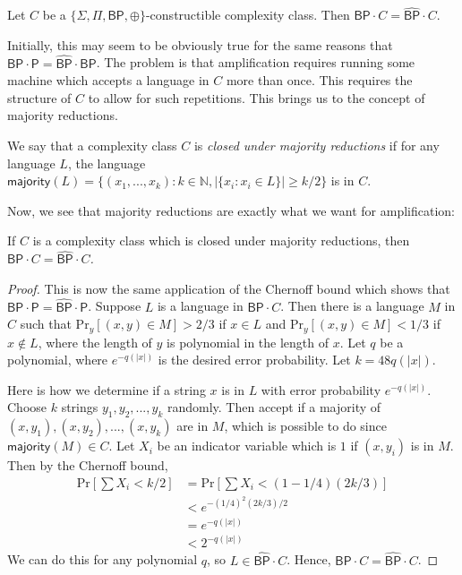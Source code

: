 \documentclass[11pt]{article}
\newcommand{\pr}{\text{Pr}}
\newcommand{\bp}{\textsf{BP}}
\newcommand{\strongbp}{\widehat{\textsf{BP}}}
\newcommand{\parity}{\oplus}
\newcommand{\p}{\textsf{P}}
\newcommand{\majority}{\textsf{majority}}
\begin{document}
\begin{theorem}\label{amplify}
Let $C$ be a \emph{$\{\Sigma,\Pi,\bp,\parity\}$}-constructible complexity class. Then \emph{$\bp \cdot C = \strongbp \cdot C$}.
\end{theorem}
Initially, this may seem to be obviously true for the same reasons that $\bp \cdot \p = \strongbp \cdot \bp$. The problem is that amplification requires running some machine which accepts a language in $C$ more than once. This requires the structure of $C$ to allow for such repetitions. This brings us to the concept of majority reductions.
\begin{definition}\label{defmajority}
We say that a complexity class $C$ is \emph{closed under majority reductions} if for any language $L$, the language $\majority(L) = \{(x_1,...,x_k) : k \in \mathbb{N}, |\{x_i : x_i \in L\}| \ge k/2\}$ is in $C$.
\end{definition}
Now, we see that majority reductions are exactly what we want for amplification:
\begin{lemma}\label{majorityimpliesamplify}
If $C$ is a complexity class which is closed under majority reductions, then\linebreak \emph{$\bp \cdot C = \strongbp \cdot C$.}
\end{lemma}
\begin{proof}
This is now the same application of the Chernoff bound which shows that $\bp \cdot \p = \strongbp \cdot \p$. Suppose $L$ is a language in $\bp \cdot C$. Then there is a language $M$ in $C$ such that $\pr_y [(x,y) \in M] > 2/3$ if $x\in L$ and $\pr_y [(x,y)\in M] < 1/3$ if $x\not\in L$, where the length of $y$ is polynomial in the length of $x$. Let $q$ be a polynomial, where $e^{-q(|x|)}$ is the desired error probability. Let $k = 48q(|x|)$.

Here is how we determine if a string $x$ is in $L$ with error probability $e^{-q(|x|)}$. Choose $k$ strings $y_1,y_2,...,y_k$ randomly. Then accept if a majority of $(x,y_1),(x,y_2),...,(x,y_k)$ are in $M$, which is possible to do since $\majority(M) \in C$. Let $X_i$ be an indicator variable which is $1$ if $(x,y_i)$ is in $M$. Then by the Chernoff bound,
\begin{align*}
\pr\left[\sum X_i < k/2\right] &= \pr\left[\sum X_i < (1 - 1/4)(2k/3)\right]\\
&< e^{-(1/4)^2 (2k/3) / 2}\\
&= e^{-q(|x|)} \\
&< 2^{-q(|x|)}
\end{align*}
We can do this for any polynomial $q$, so $L \in \strongbp \cdot C$. Hence, $\bp \cdot C = \strongbp \cdot C$.
\end{proof}
\end{document}
